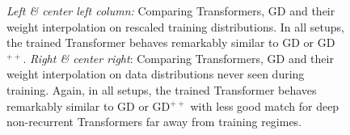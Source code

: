\documentclass{article}
\theoremstyle{plain}
\theoremstyle{definition}
\theoremstyle{remark}
\begin{document}
\begin{figure}
\begin{center}
\begin{minipage}{.24\textwidth}
\begin{center}
  \end{center}
  \vspace{-10pt}
\end{minipage}
\end{center}
\vspace{-3pt}
  \caption{\textit{Left \& center left column:}  Comparing Transformers, GD and their weight interpolation on rescaled training distributions. In all setups, the trained Transformer behaves remarkably similar to GD or GD$^{++}$.
  \textit{Right \& center right}: Comparing Transformers, GD and their weight interpolation on data distributions never seen during training. Again, in all setups, the trained Transformer behaves remarkably similar to GD or GD$^{++}$ with less good match for deep non-recurrent Transformers far away from training regimes.}
  \label{fig:ood_big}
  \vspace{-10pt}
\end{figure}
\end{document}
